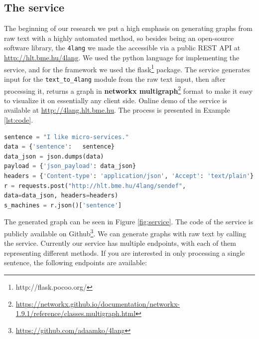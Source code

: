\subsection{The service}
The beginning of our research we put a high emphasis on generating graphs from raw text with a highly automated method, so besides being an open-source software library,
the \texttt{4lang} we made the accessible via a public
REST API at \url{http://hlt.bme.hu/4lang}. We used the python language for implementing the service, and for the framework we used the flask\footnote{http://flask.pocoo.org/} package. The service generates input for the \texttt{text\_to\_4lang} module from the raw text input, then after processing it, returns a graph in \textbf{networkx multigraph}\footnote{\url{https://networkx.github.io/documentation/networkx-1.9.1/reference/classes.multigraph.html}} format to make it easy to visualize it on essentially any client side. Online demo of the service is available at \url{http://4lang.hlt.bme.hu}. 
The process is presented in Example \ref{lst:code}.
\begin{center}
	\begin{lstlisting}[caption={Demonstration of the service in python language.},language=python, label={lst:code}]
sentence = "I like micro-services." 
data = {'sentence':   sentence}
data_json = json.dumps(data)
payload = {'json_payload': data_json}
headers = {'Content-type': 'application/json', 'Accept': 'text/plain'}
r = requests.post("http://hlt.bme.hu/4lang/sendef", 
data=data_json, headers=headers)
s_machines = r.json()['sentence']
\end{lstlisting}
\end{center}


The generated graph can be seen in Figure \ref{fig:service}. The code of the service is publicly available on Github\footnote{\url{https://github.com/adaamko/4lang}}. We can generate graphs with raw text by calling the service. Currently our service has multiple endpoints, with each of them representing different methods.
If you are interested in only processing a single sentence, the following endpoints are available:

